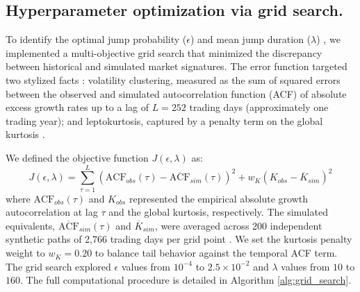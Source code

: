 \subsection*{Hyperparameter optimization via grid search.}
To identify the optimal jump probability ($\epsilon$) and mean jump duration ($\lambda$) \cite{merton_jump_1976, kou_jump-diffusion_2002}, we implemented a multi-objective grid search that minimized the discrepancy between historical and simulated market signatures. The error function targeted two stylized facts \cite{cont_empirical_2001, ryden_stylized_1998}: volatility clustering, measured as the sum of squared errors between the observed and simulated autocorrelation function (ACF) of absolute excess growth rates \cite{schwert_why_1989} up to a lag of $L=252$ trading days (approximately one trading year); and leptokurtosis, captured by a penalty term on the global kurtosis \cite{mandelbrot_variation_1963}.

We defined the objective function $J(\epsilon, \lambda)$ as:
\begin{equation}
    J(\epsilon, \lambda) = \sum_{\tau=1}^{L} \left( \text{ACF}_{obs}(\tau) - \overline{\text{ACF}}_{sim}(\tau) \right)^2 + w_K \left( K_{obs} - \overline{K}_{sim} \right)^2
    \label{eq:grid_search}
\end{equation}
where $\text{ACF}_{obs}(\tau)$ and $K_{obs}$ represented the empirical absolute growth autocorrelation at lag $\tau$ and the global kurtosis, respectively. The simulated equivalents, $\overline{\text{ACF}}_{sim}(\tau)$ and $\overline{K}_{sim}$, were averaged across 200 independent synthetic paths of 2,766 trading days per grid point \cite{glasserman_monte_2003}. We set the kurtosis penalty weight to $w_K = 0.20$ to balance tail behavior against the temporal ACF term. The grid search explored $\epsilon$ values from $10^{-4}$ to $2.5\times10^{-2}$ and $\lambda$ values from $10$ to $160$. The full computational procedure is detailed in Algorithm \ref{alg:grid_search}.

